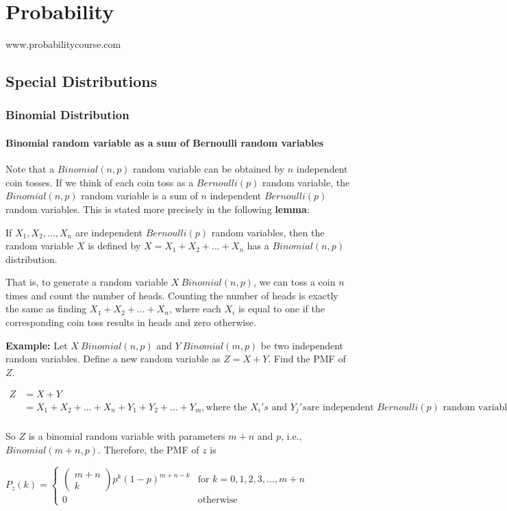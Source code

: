 \documentclass{report}
\begin{document}
\tableofcontents{}

\chapter{Probability}
www.probabilitycourse.com


\section{Special Distributions}
\subsection{Binomial Distribution}

\subsubsection{Binomial random variable as a sum of Bernoulli random variables}
\noindent Note that a $Binomial(n,p)$ random variable can be obtained by $n$ independent coin tosses. If we think of each coin toss as a $Bernoulli(p)$ random variable, the $Binomial(n,p)$ random variable is a sum of $n$ independent $Bernoulli(p)$ random variables. This is stated more precisely in the following \textbf{lemma}:\medskip

\noindent If $X_1,X_2,...,X_n$ are independent $Bernoulli(p)$ random variables, then the random variable $X$ is defined by $X=X_1+X_2+...+X_n$ has a $Binomial(n,p)$ distribution.

\noindent That is, to generate a random variable $X ~ Binomial(n,p)$, we can toss a coin $n$ times and count the number of heads. Counting the number of heads is exactly the same as finding $X_1+X_2+...+X_n$, where each $X_i$ is equal to one if the corresponding coin toss results in heads and zero otherwise.

\noindent \textbf{Example:} Let $X~Binomial(n,p)$ and $Y~Binomial(m,p)$ be two independent random variables. Define a new random variable as $Z=X+Y$. Find the PMF of $Z$.\medskip

$\begin{aligned}
	Z &= X + Y \\
      &= X_1 + X_2 + ... + X_n + Y_1 + Y_2 + ... + Y_m, 
      \text{where the } X_i's \text{ and } Y_j's \text{are independent } Bernoulli(p) \text{ random variables} \\
\end{aligned}$

\noindent So $Z$ is a binomial random variable with parameters $m + n$ and $p$, i.e., $Binomial(m+n,p)$. Therefore, the PMF of $z$ is\newline\newline
\centerline{$P_z(k) = 
\left\{\begin{matrix}
\begin{pmatrix}
m+n \\ 
k
\end{pmatrix} p^k(1-p)^{m+n-k} & \text{for } k = 0,1,2,3,...,m+n \\ 
0 & \text{otherwise}
\end{matrix}\right.$}\newline\newline
\end{document}
